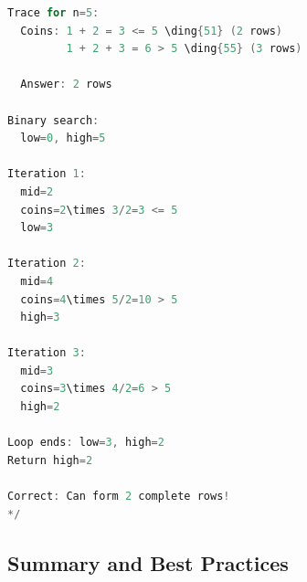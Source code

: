 \documentclass[11pt,a4paper,oneside]{book}
\begin{document}
\begin{lstlisting}[language=C++, caption=Complete Application Solutions]
Trace for n=5:
  Coins: 1 + 2 = 3 <= 5 \ding{51} (2 rows)
         1 + 2 + 3 = 6 > 5 \ding{55} (3 rows)
  
  Answer: 2 rows

Binary search:
  low=0, high=5

Iteration 1:
  mid=2
  coins=2\times 3/2=3 <= 5 
  low=3

Iteration 2:
  mid=4
  coins=4\times 5/2=10 > 5 
  high=3

Iteration 3:
  mid=3
  coins=3\times 4/2=6 > 5 
  high=2

Loop ends: low=3, high=2
Return high=2 

Correct: Can form 2 complete rows!
*/
\end{lstlisting}

\subsection{Summary and Best Practices}
\end{document}
